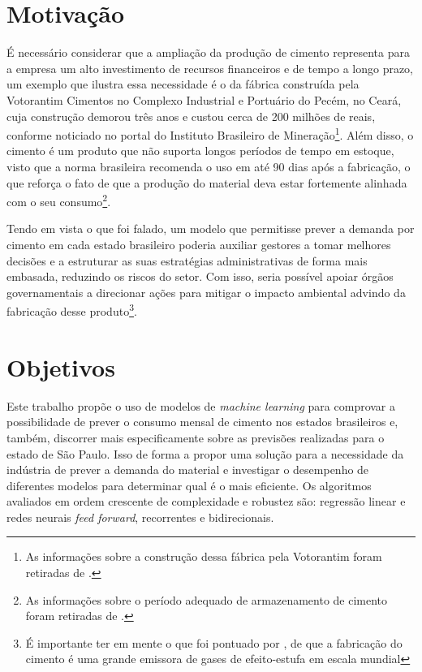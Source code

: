 \section*{Motivação}

É necessário considerar que a ampliação da produção de cimento representa para a empresa um alto investimento de recursos financeiros e de tempo a longo prazo, um exemplo que ilustra essa necessidade é o da fábrica construída pela Votorantim Cimentos no Complexo Industrial e Portuário do Pecém, no Ceará, cuja construção demorou três anos e custou cerca de 200 milhões de reais, conforme noticiado no portal do Instituto Brasileiro de Mineração\footnote{As informações sobre a construção dessa fábrica pela Votorantim foram retiradas de \cite{fabrica-noticia}.}. Além disso, o cimento é um produto que não suporta longos períodos de tempo em estoque, visto que a norma brasileira recomenda
o uso em até 90 dias após a fabricação, o que reforça o fato de que a produção do material deva estar fortemente alinhada com o seu  
consumo\footnote{As informações sobre o período adequado de armazenamento de cimento foram retiradas de \citet{abnt}.}.

Tendo em vista o que foi falado, um modelo que permitisse prever a demanda por cimento em cada  
estado brasileiro poderia auxiliar gestores a tomar melhores 
decisões e a estruturar as suas estratégias administrativas  de forma mais embasada, reduzindo os riscos do setor. Com isso, seria possível apoiar órgãos 
governamentais a direcionar ações para mitigar o impacto ambiental advindo da
fabricação desse produto\footnote{É importante ter em mente o que foi pontuado por \citet{meio-ambiente}, de que a fabricação do cimento é uma grande emissora de gases de efeito-estufa em escala mundial}.


\section*{Objetivos}

Este trabalho propõe o uso de modelos de \textit{machine learning} para comprovar a possibilidade de prever o consumo mensal de cimento nos estados brasileiros e, também, discorrer mais especificamente sobre as previsões realizadas para o estado de São Paulo. Isso de forma a propor uma solução para a necessidade da indústria de prever a demanda 
do material e investigar
o desempenho de diferentes modelos para determinar qual é o mais eficiente. 
Os algoritmos avaliados em ordem 
crescente de complexidade e robustez são: 
regressão linear e redes neurais \textit{feed forward}, recorrentes e bidirecionais.

